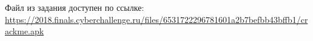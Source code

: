 
Файл из задания доступен по ссылке: \url{https://2018.finals.cyberchallenge.ru/files/6531722296781601a2b7befbb43bffb1/crackme.apk}
 
